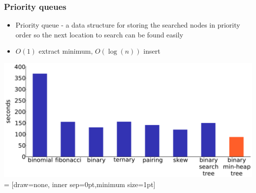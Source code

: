 \documentclass{beamer}
\begin{document}
\begin{frame}
    \frametitle{Priority queues}
    \begin{itemize}
        \item Priority queue - a data structure for storing the searched nodes in priority order so the next location to search can be found easily
        \item $O(1)$ extract minimum, $O(\log(n))$ insert
    \end{itemize}
    \includegraphics[page=1,width=\textwidth, keepaspectratio]{img/pq_runtime}
     = [draw=none, inner sep=0pt,minimum size=1pt]
\end{frame}
\end{document}
